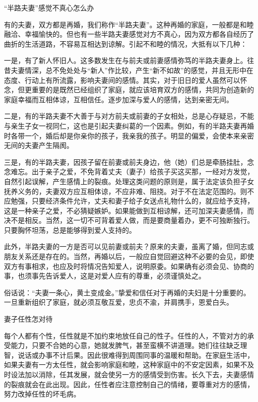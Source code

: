 \documentclass[12pt,UTF8]{ctexbook}
\begin{document}
“半路夫妻”感觉不真心怎么办


有的夫妻，双方都是再婚，我们称作“半路夫妻”。这种再婚的家庭，一般都是和睦融洽、幸福愉快的。但也有一些半路夫妻感觉对方不真心，因为双方都各自经历了曲折的生活道路，不容易互相达到谅解。引起不和睦的情况，大抵有以下几种：

一是，有了新人怀旧人。这多数发生在与前夫或前妻感情弥笃的半路夫妻身上。往昔夫妻情深，总不免处处与“新人”作比较，产生“新不如故”的感觉，并且无形中在态度、行动上有所流露，影响夫妻间的感情。其实，对于旧日的爱人虽然可以怀念，但更重要的是既然已经组织了家庭，就应该培育双方的感情，共同为创造新的家庭幸福而互相体谅，互相信任。逐步加深与爱人的感情，达到亲密无间。

二是，有的半路夫妻不大善于与对方前夫或前妻的子女相处，总是心存疑忌，不能与亲生子女一视同仁，这也是引起夫妻纠葛的一个因素。例如，有的半路夫妻再婚时各带一个，婚后却是你亲你的孩子，我亲我的孩子。明显的偏爱，会使本来亲密无间的夫妻产生隔阂。

三是，有的半路夫妻，因孩子留在前妻或前夫身边，他（她）们总是牵肠挂肚，念念难忘。出于亲子之爱，不免背着丈夫（妻子）给孩子买这买那，一经对方发觉，自然引起误解，产生感情上的裂痕。处理这类问题的原则是，属于法定该负担子女抚养义务的，夫妻双方应互相体谅，不应非难、阻挠。对于不在法定范围的。则不应勉强，只要经济条件允许，丈夫和妻子给子女送点礼物什么的，就应给予支持，这是一种亲子之爱，不必猜疑嫉妒。如果能做到互相谅解，还可加深夫妻感情，而决不是相反。当然，这一切不可背着爱人做，而是要商量着办，更不可独断独行。只要胸怀坦荡，总是能够得到爱人支持的。

此外，半路夫妻的一方是否可以见前妻或前夫？原来的夫妻，虽离了婚，但同志或朋友关系还是存在的。当然，再婚以后，一般应自觉回避这种不必要的会见，即使双方有事相求，也应及时将情况告知爱人，说明原委。如果确有必须会见、协商的事，也须事先告诉爱人，这是对爱人应有的尊重，必须谨慎处之。

俗话说：“夫妻一条心，黄土变成金。”挚爱和信任对于再婚的夫妇是十分重要的。一旦重新组织了家庭，就必须互敬互爱，忠贞不渝，并肩携手，恩爱白头。





妻子任性怎对待


每个人都有个性，任性就是不加约束地放任自己的性子。任性的人，不管对方的承受能力，只要不合她的心意，她就发脾气，甚至蛮横不讲道理。她们往往缺乏理智，说话或办事不计后果。因此很难得到周围同事的温暖和帮助。在家庭生活中，如果夫妻有一方太任性，就会影响家庭和睦，这种家庭中的不安定因素，如果不及时设法加以消除，任其发展，就会使另一方的感情受到伤害。长久下去，夫妻感情的裂痕就会在此出现。因此，任性者应注意控制自己的情绪，要尊重对方的感情，努力改掉任性的坏毛病。
\end{document}
